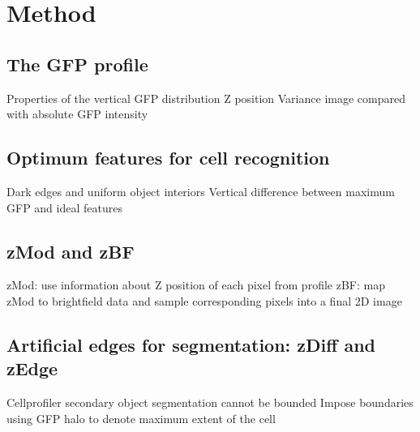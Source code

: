 
\chapter{Method}

\ifpdf
    \graphicspath{{Chapter4/Figs/Raster/}{Chapter4/Figs/PDF/}{Chapter4/Figs/}}
\else
    \graphicspath{{Chapter4/Figs/Vector/}{Chapter4/Figs/}}
\fi

\section{The GFP profile}

Properties of the vertical GFP distribution
Z position
Variance image compared with absolute GFP intensity

\section{Optimum features for cell recognition}

Dark edges and uniform object interiors
Vertical difference between maximum GFP and ideal features

\section{zMod and zBF}

zMod: use information about Z position of each pixel from profile
zBF: map zMod to brightfield data and sample corresponding pixels into a final 2D image

\section{Artificial edges for segmentation: zDiff and zEdge}

Cellprofiler secondary object segmentation cannot be bounded
Impose boundaries using GFP halo to denote maximum extent of the cell
